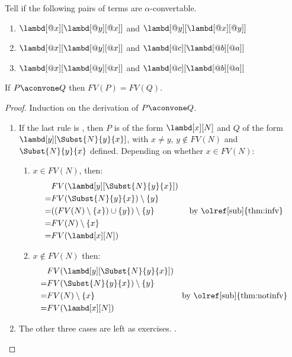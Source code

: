 \documentclass[../../../include/open-logic-section]{subfiles}
\begin{document}
\begin{prob}
  Tell if the following pairs of terms are $\alpha$-convertable.
  \begin{enumerate}
  \item $\lambd[@x][\lambd[@y][@x]]$ and $\lambd[@y][\lambd[@x][@y]]$
  \item $\lambd[@x][\lambd[@y][@x]]$ and $\lambd[@c][\lambd[@b][@a]]$
  \item $\lambd[@x][\lambd[@y][@x]]$ and $\lambd[@c][\lambd[@b][@a]]$
  \end{enumerate}
\end{prob}

\begin{lem}
  If $P \aconvone Q$ then $FV(P) = FV(Q)$.
\end{lem}
\begin{proof}
  Induction on the derivation of $P \aconvone Q$.
  \begin{enumerate}
  \item If the last rule is , then $P$ is of the form
    $\lambd[x][N]$ and $Q$ of the form
    $\lambd[y][\Subst{N}{y}{x}]$, with $x \neq y$, $y \notin
    FV(N)$ and $\Subst{N}{y}{x}$ defined. Depending on whether
    $x \in FV(N)$:
    \begin{enumerate}
    \item $x \in FV(N)$, then:
      \begin{align*}
        &FV(\lambd[y][\Subst{N}{y}{x}])\\
        =&FV(\Subst{N}{y}{x}) \setminus \{y\} \\
        =&((FV(N) \setminus \{x\}) \cup \{y\}) \setminus \{y\}
         && \text{ by \olref[sub]{thm:infv}} \\
        =&FV(N) \setminus \{x\} \\
        =&FV(\lambd[x][N])
      \end{align*}
    \item $x \notin FV(N)$ then:
      \begin{align*}
        &FV(\lambd[y][\Subst{N}{y}{x}])\\
        =&FV(\Subst{N}{y}{x}) \setminus \{y\} \\
        =&FV(N) \setminus \{x\}
         && \text{by \olref[sub]{thm:notinfv}} \\
        =&FV(\lambd[x][N])
      \end{align*}
    \end{enumerate}
  \item The other three cases are left as exercises. .
  \end{enumerate}
\end{proof}
\end{document}
